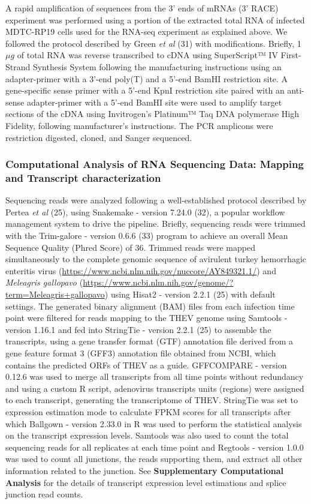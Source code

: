 \documentclass[
]{article}
\begin{document}
A rapid amplification of sequences from the 3' ends of mRNAs (3' RACE)
experiment was performed using a portion of the extracted total RNA of
infected MDTC-RP19 cells used for the RNA-seq experiment as explained
above. We followed the protocol described by Green \emph{et al} (31)
with modifications. Briefly, 1\(\mu g\) of total RNA was reverse
transcribed to cDNA using SuperScript™ IV First-Strand Synthesis System
following the manufacturing instructions using an adapter-primer with a
3'-end poly(T) and a 5'-end BamHI restriction site. A gene-specific
sense primer with a 5'-end KpnI restriction site paired with an
anti-sense adapter-primer with a 5'-end BamHI site were used to amplify
target sections of the cDNA using Invitrogen's Platinum™ Taq DNA
polymerase High Fidelity, following manufacturer's instructions. The PCR
amplicons were restriction digested, cloned, and Sanger sequenced.

\subsubsection{Computational Analysis of RNA Sequencing Data: Mapping
and Transcript
characterization}\label{computational-analysis-of-rna-sequencing-data-mapping-and-transcript-characterization}

Sequencing reads were analyzed following a well-established protocol
described by Pertea \emph{et al} (25), using Snakemake - version 7.24.0
(32), a popular workflow management system to drive the pipeline.
Briefly, sequencing reads were trimmed with the Trim-galore - version
0.6.6 (33) program to achieve an overall Mean Sequence Quality (Phred
Score) of 36. Trimmed reads were mapped simultaneously to the complete
genomic sequence of avirulent turkey hemorrhagic enteritis virus
(\url{https://www.ncbi.nlm.nih.gov/nuccore/AY849321.1/}) and
\emph{Meleagris gallopavo}
(\url{https://www.ncbi.nlm.nih.gov/genome/?term=Meleagris+gallopavo})
using Hisat2 - version 2.2.1 (25) with default settings. The generated
binary alignment (BAM) files from each infection time point were
filtered for reads mapping to the THEV genome using Samtools - version
1.16.1 and fed into StringTie - version 2.2.1 (25) to assemble the
transcripts, using a gene transfer format (GTF) annotation file derived
from a gene feature format 3 (GFF3) annotation file obtained from NCBI,
which contains the predicted ORFs of THEV as a guide. GFFCOMPARE -
version 0.12.6 was used to merge all transcripts from all time points
without redundancy and using a custom R script, adenovirus transcripts
units (regions) were assigned to each transcript, generating the
transcriptome of THEV. StringTie was set to expression estimation mode
to calculate FPKM scores for all transcripts after which Ballgown -
version 2.33.0 in R was used to perform the statistical analysis on the
transcript expression levels. Samtools was also used to count the total
sequencing reads for all replicates at each time point and Regtools -
version 1.0.0 was used to count all junctions, the reads supporting
them, and extract all other information related to the junction. See
\textbf{Supplementary Computational Analysis} for the details of
transcript expression level estimations and splice junction read counts.
\end{document}
